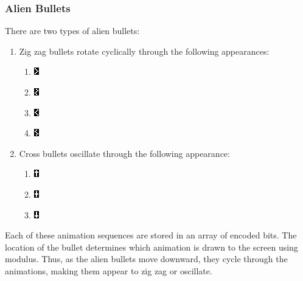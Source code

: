 \documentclass[11pt,letter,oneside]{report}
\begin{document}
\subsubsection{Alien Bullets}
There are two types of alien bullets:
\begin{enumerate}
\item{}  Zig zag bullets rotate cyclically through the following appearances:

\begin{enumerate}
\item 
 \includegraphics[scale=2]{ZigBullet0.png}
\item 
 \includegraphics[scale=2]{ZigBullet1.png}
\item
 \includegraphics[scale=2]{ZigBullet2.png}
\item
 \includegraphics[scale=2]{ZigBullet3.png}
\end{enumerate}

\item{}  Cross bullets oscillate through the following appearance:

\begin{enumerate}
\item
 \includegraphics[scale=2]{TBullet0.png}
\item
 \includegraphics[scale=2]{TBullet1.png}
\item
 \includegraphics[scale=2]{TBullet2.png}
\end{enumerate}

\end{enumerate}

Each of these animation sequences are stored in an array of encoded bits. The location of the bullet determines which animation is drawn to the screen using modulus. Thus, as the alien bullets move downward, they cycle through the animations, making them appear to zig zag or oscillate.
\end{document}
